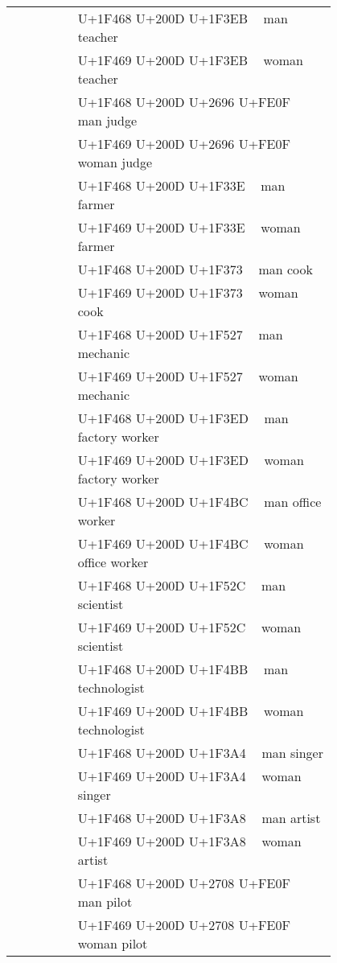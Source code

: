 \documentclass[a4paper,12pt]{article}
\newcommand{\fontA}[1]{{\fontspec[RawFeature={mode=harf,+dist,+ccmp}]{Segoe UI Emoji} #1}}
\newcommand{\fontB}[1]{{\fontspec[RawFeature={mode=harf,+dist,+ccmp}]{Noto Color Emoji} #1}}
\begin{document}
\begin{longtable}[c]{ccp{0.8\linewidth}}
\fontA{👨‍🏫}&\fontB{👨‍🏫}&U+1F468 U+200D U+1F3EB 👨‍🏫 man teacher\\
\fontA{👩‍🏫}&\fontB{👩‍🏫}&U+1F469 U+200D U+1F3EB 👩‍🏫 woman teacher\\
\fontA{👨‍⚖️}&\fontB{👨‍⚖️}&U+1F468 U+200D U+2696 U+FE0F 👨‍⚖️ man judge\\
\fontA{👩‍⚖️}&\fontB{👩‍⚖️}&U+1F469 U+200D U+2696 U+FE0F 👩‍⚖️ woman judge\\
\fontA{👨‍🌾}&\fontB{👨‍🌾}&U+1F468 U+200D U+1F33E 👨‍🌾 man farmer\\
\fontA{👩‍🌾}&\fontB{👩‍🌾}&U+1F469 U+200D U+1F33E 👩‍🌾 woman farmer\\
\fontA{👨‍🍳}&\fontB{👨‍🍳}&U+1F468 U+200D U+1F373 👨‍🍳 man cook\\
\fontA{👩‍🍳}&\fontB{👩‍🍳}&U+1F469 U+200D U+1F373 👩‍🍳 woman cook\\
\fontA{👨‍🔧}&\fontB{👨‍🔧}&U+1F468 U+200D U+1F527 👨‍🔧 man mechanic\\
\fontA{👩‍🔧}&\fontB{👩‍🔧}&U+1F469 U+200D U+1F527 👩‍🔧 woman mechanic\\
\fontA{👨‍🏭}&\fontB{👨‍🏭}&U+1F468 U+200D U+1F3ED 👨‍🏭 man factory worker\\
\fontA{👩‍🏭}&\fontB{👩‍🏭}&U+1F469 U+200D U+1F3ED 👩‍🏭 woman factory worker\\
\fontA{👨‍💼}&\fontB{👨‍💼}&U+1F468 U+200D U+1F4BC 👨‍💼 man office worker\\
\fontA{👩‍💼}&\fontB{👩‍💼}&U+1F469 U+200D U+1F4BC 👩‍💼 woman office worker\\
\fontA{👨‍🔬}&\fontB{👨‍🔬}&U+1F468 U+200D U+1F52C 👨‍🔬 man scientist\\
\fontA{👩‍🔬}&\fontB{👩‍🔬}&U+1F469 U+200D U+1F52C 👩‍🔬 woman scientist\\
\fontA{👨‍💻}&\fontB{👨‍💻}&U+1F468 U+200D U+1F4BB 👨‍💻 man technologist\\
\fontA{👩‍💻}&\fontB{👩‍💻}&U+1F469 U+200D U+1F4BB 👩‍💻 woman technologist\\
\fontA{👨‍🎤}&\fontB{👨‍🎤}&U+1F468 U+200D U+1F3A4 👨‍🎤 man singer\\
\fontA{👩‍🎤}&\fontB{👩‍🎤}&U+1F469 U+200D U+1F3A4 👩‍🎤 woman singer\\
\fontA{👨‍🎨}&\fontB{👨‍🎨}&U+1F468 U+200D U+1F3A8 👨‍🎨 man artist\\
\fontA{👩‍🎨}&\fontB{👩‍🎨}&U+1F469 U+200D U+1F3A8 👩‍🎨 woman artist\\
\fontA{👨‍✈️}&\fontB{👨‍✈️}&U+1F468 U+200D U+2708 U+FE0F 👨‍✈️ man pilot\\
\fontA{👩‍✈️}&\fontB{👩‍✈️}&U+1F469 U+200D U+2708 U+FE0F 👩‍✈️ woman pilot\\

\end{longtable}
\end{document}
